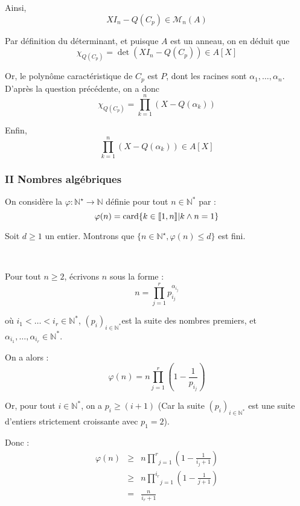 Ainsi,
\[ X I_n - Q (C_p) \in \mathcal{M}_n (A) \]


Par d{\'e}finition du d{\'e}terminant, et puisque $A$ est un anneau, on en
d{\'e}duit que
\[ \chi_{Q (C_p)} = \det (X I_n - Q (C_p)) \in A [X] \]


Or, le polyn{\^o}me caract{\'e}ristique de $C_p$ est $P$, dont les racines
sont $\alpha_1, \ldots, \alpha_n$. D'apr{\`e}s la question pr{\'e}c{\'e}dente,
on a donc
\[ \chi_{Q (C_p)} = \underset{k = 1}{\overset{n}{\prod}} (X - Q (\alpha_k)) \]


Enfin,
\[ \underset{k = 1}{\overset{n}{\prod}} (X - Q (\alpha_k)) \in A [X] \]


\subsubsection*{II Nombres alg{\'e}briques}

On consid{\`e}re la $\varphi : \mathbb{N}^{\star} \rightarrow
\mathbb{N}$ d{\'e}finie pour tout $n \in \mathbb{N}^{\ast}$ par :
\[ \varphi (n) = \operatorname{card} \{ k \in \llbracket 1, n \rrbracket  | 
   k \wedge n = 1 \} \]


Soit $d \geqslant 1$ un entier. Montrons que $\{ n \in \mathbb{N}^{\star},
\varphi (n) \leqslant d \}$ est fini.

\

Pour tout $n \geqslant 2$, {\'e}crivons $n$ sous la forme :
\[ n = \underset{j = 1}{\overset{r}{\prod}} p^{\alpha_{i_j}}_{i_j} \]


o{\`u} $i_1 < \ldots < i_r \in \mathbb{N}^{\ast}$, $(p_i)_{i \in
\mathbb{N}^{\ast}} $est la suite des nombres premiers, et $\alpha_{i_1},
\ldots, \alpha_{i_r} \in \mathbb{N}^{\ast}$.

On a alors :
\[ \varphi (n) = n \underset{j = 1}{\overset{r}{\prod}} \left( 1 -
   \frac{1}{p_{i_j}} \right) \]


Or, pour tout $i \in \mathbb{N}^{\ast}$, on a $p_i \geqslant (i + 1)$ (Car la
suite $(p_i)_{i \in \mathbb{N}^{\ast}}$ est une suite d'entiers strictement
croissante avec $p_1 = 2$).

Donc :
\begin{eqnarray*}
  \varphi (n) & \geqslant & n \underset{j = 1}{\overset{r}{\prod}} \left( 1 -
  \frac{1}{i_j + 1} \right)\\
  & \geqslant & n \underset{j = 1}{\overset{i_r}{\prod}} \left( 1 -
  \frac{1}{j + 1} \right)\\
  & = & \frac{n}{i_r + 1}
\end{eqnarray*}


